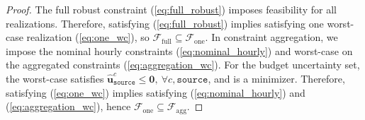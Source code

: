 \documentclass[11pt, letter]{article}
\begin{document}
\begin{proof}
The full robust constraint (\ref{eq:full_robust}) imposes feasibility for all realizations. Therefore, satisfying (\ref{eq:full_robust}) implies satisfying one worst-case realization (\ref{eq:one_wc}), so $\mathcal{F}_\text{full} \subseteq \mathcal{F}_\text{one}$. In constraint aggregation, we impose the nominal hourly constraints (\ref{eq:nominal_hourly}) and worst-case on the aggregated constraints (\ref{eq:aggregation_wc}). 
For the budget uncertainty set, the worst-case satisfies $\hat{\boldsymbol{u}}_\texttt{source}^c \le \boldsymbol{0}, \ \forall c,\texttt{source}$, and is a minimizer. Therefore, satisfying (\ref{eq:one_wc}) implies satisfying (\ref{eq:nominal_hourly}) and (\ref{eq:aggregation_wc}), hence $\mathcal{F}_\text{one} \subseteq \mathcal{F}_\text{agg}$.
\end{proof}
\end{document}
